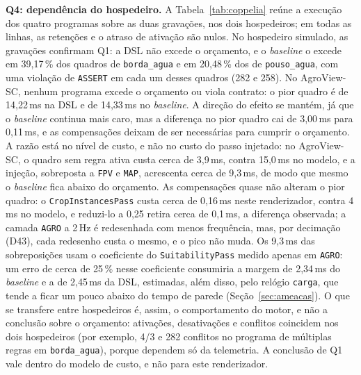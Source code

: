 \documentclass[conference]{IEEEtran}
\begin{document}
\textbf{Q4: dependência do hospedeiro.} A Tabela~\ref{tab:coppelia} reúne a
execução dos
quatro programas sobre as duas gravações, nos dois hospedeiros; em todas as
linhas, as retenções e o atraso de ativação são nulos. No hospedeiro simulado,
as gravações confirmam Q1: a DSL não excede o orçamento, e o \textit{baseline}
o excede em 39,17\,\% dos quadros de \texttt{borda\_agua} e em 20,48\,\% dos de
\texttt{pouso\_agua}, com uma violação de \texttt{ASSERT} em cada um desses
quadros (282 e 258). No AgroView-SC, nenhum programa excede o orçamento ou viola
contrato: o pior quadro é de 14,22\,ms na DSL e de 14,33\,ms no
\textit{baseline}. A direção do efeito se mantém, já que o \textit{baseline}
continua mais caro, mas a diferença no pior quadro cai de 3,00\,ms para
0,11\,ms, e as compensações deixam de ser necessárias para cumprir o orçamento.
A razão está no nível de custo, e não no custo do passo injetado: no
AgroView-SC, o quadro sem regra ativa custa cerca de 3,9\,ms, contra 15,0\,ms
no modelo, e a injeção, sobreposta a \texttt{FPV} e \texttt{MAP}, acrescenta
cerca de 9,3\,ms, de modo que mesmo o \textit{baseline} fica abaixo do
orçamento. As compensações quase não alteram o pior quadro: o
\texttt{CropInstancesPass} custa cerca de 0,16\,ms neste renderizador, contra
4\,ms no modelo, e reduzi-lo a 0,25 retira cerca de 0,1\,ms, a diferença
observada; a camada
\texttt{AGRO} a 2\,Hz é redesenhada com menos frequência, mas, por decimação
(D43), cada redesenho custa o mesmo, e o pico não muda. Os 9,3\,ms das
sobreposições usam o coeficiente do \texttt{SuitabilityPass} medido apenas em
\texttt{AGRO}: um erro de cerca de 25\,\% nesse coeficiente consumiria a
margem de 2,34\,ms do \textit{baseline} e a de 2,45\,ms da DSL, estimadas,
além disso, pelo relógio \texttt{carga}, que tende a ficar um pouco abaixo do
tempo de parede (Seção~\ref{sec:ameacas}). O que se transfere entre hospedeiros é, assim, o
comportamento do motor, e não a conclusão sobre o orçamento: ativações,
desativações e conflitos coincidem nos dois hospedeiros (por exemplo, 4/3 e 282
conflitos no programa de múltiplas regras em \texttt{borda\_agua}), porque
dependem só da telemetria. A conclusão de Q1 vale dentro do modelo de custo, e
não para este renderizador.
\end{document}
